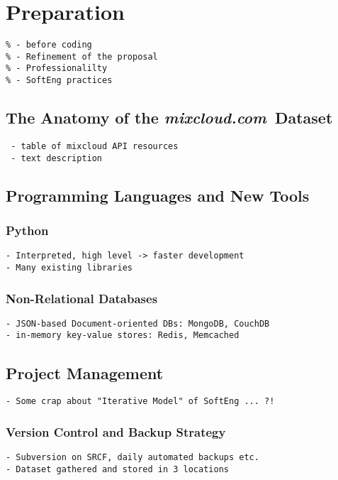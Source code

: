\documentclass[a4paper,12pt,twoside,notitlepage]{report}
\def\mixurl{\emph{mixcloud.com}}
\begin{document}
\chapter{Preparation}
\begin{verbatim}
% - before coding
% - Refinement of the proposal
% - Professionalilty
% - SoftEng practices 
\end{verbatim}

\section{The Anatomy of the \mixurl\ Dataset}

\begin{verbatim}
 - table of mixcloud API resources
 - text description
\end{verbatim}

\section{Programming Languages and New Tools}

\subsection{Python}

\begin{verbatim}
- Interpreted, high level -> faster development
- Many existing libraries 
\end{verbatim}


\subsection{Non-Relational Databases}

\begin{verbatim}
- JSON-based Document-oriented DBs: MongoDB, CouchDB
- in-memory key-value stores: Redis, Memcached
\end{verbatim}

\section{Project Management}

\begin{verbatim}
- Some crap about "Iterative Model" of SoftEng ... ?! 
\end{verbatim}

\subsection{Version Control and Backup Strategy}
\begin{verbatim}
- Subversion on SRCF, daily automated backups etc.
- Dataset gathered and stored in 3 locations 
\end{verbatim}
\end{document}
